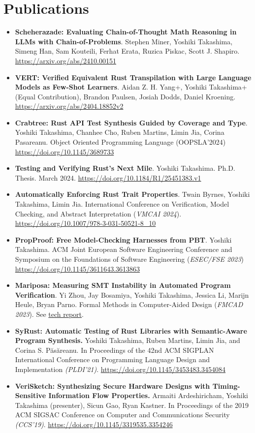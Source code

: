 \documentclass[11pt]{article}
\begin{document}
\section*{Publications}
\label{sec:org819cb03}
\begin{itemize}
\item \textbf{Scheherazade: Evaluating Chain-of-Thought Math Reasoning in LLMs
with Chain-of-Problems}. Stephen Miner, Yoshiki Takashima, Simeng
Han, Sam Kouteili, Ferhat Erata, Ruzica Piskac, Scott
J. Shapiro. \url{https://arxiv.org/abs/2410.00151}
\item \textbf{VERT: Verified Equivalent Rust Transpilation with Large Language
Models as Few-Shot Learners}. Aidan Z. H. Yang+, Yoshiki
Takashima+ (Equal Contribution), Brandon Paulsen, Josiah Dodds, Daniel
Kroening. \url{https://arxiv.org/abs/2404.18852v2}
\item \textbf{Crabtree: Rust API Test Synthesis Guided by Coverage and
Type}. Yoshiki Takashima, Chanhee Cho, Ruben Martins, Limin Jia,
Corina Pasareanu. Object Oriented Programming Language
(OOPSLA'2024) \url{https://doi.org/10.1145/3689733}
\item \textbf{Testing and Verifying Rust's Next Mile}. Yoshiki
Takashima. Ph.D. Thesis. March 2024. \url{https://doi.org/10.1184/R1/25451383.v1}
\item \textbf{Automatically Enforcing Rust Trait Properties}. Twain Byrnes,
Yoshiki Takashima, Limin Jia. International Conference on
Verification, Model Checking, and Abstract Interpretation (\emph{VMCAI
2024}). \url{https://doi.org/10.1007/978-3-031-50521-8\_10}
\item \textbf{PropProof: Free Model-Checking Harnesses from PBT}. Yoshiki
Takashima. ACM Joint European Software Engineering Conference and
Symposium on the Foundations of Software Engineering
(\emph{ESEC/FSE 2023}) \href{https://doi.org/10.1145/3611643.3613863}{https://doi.org/10.1145/3611643.3613863}
\item \textbf{Mariposa: Measuring SMT Instability in Automated Program
Verification}. Yi Zhou, Jay Bosamiya, Yoshiki Takashima, Jessica
Li, Marijn Heule, Bryan Parno. Formal Methods in Computer-Aided
Design (\emph{FMCAD 2023}). See \href{https://kilthub.cmu.edu/articles/report/Mariposa\_Measuring\_SMT\_Instability\_in\_Automated\_Program\_Verification\_Technical\_Report\_/23905905}{tech report}.
\item \textbf{SyRust: Automatic Testing of Rust Libraries with Semantic-Aware
Program Synthesis.} Yoshiki Takashima, Ruben Martins, Limin Jia,
and Corina S. Păsăreanu. In Proceedings of the 42nd ACM SIGPLAN
International Conference on Programming Language Design and
Implementation \emph{(PLDI’21)}. \url{https://doi.org/10.1145/3453483.3454084}
\item \textbf{VeriSketch: Synthesizing Secure Hardware Designs with
Timing-Sensitive Information Flow Properties.} Armaiti
Ardeshiricham, Yoshiki Takashima (presenter), Sicun Gao, Ryan
Kastner. In Proceedings of the 2019 ACM SIGSAC Conference on
Computer and Communications Security \emph{(CCS’19)}.
\url{https://doi.org/10.1145/3319535.3354246}
\end{itemize}
\end{document}
